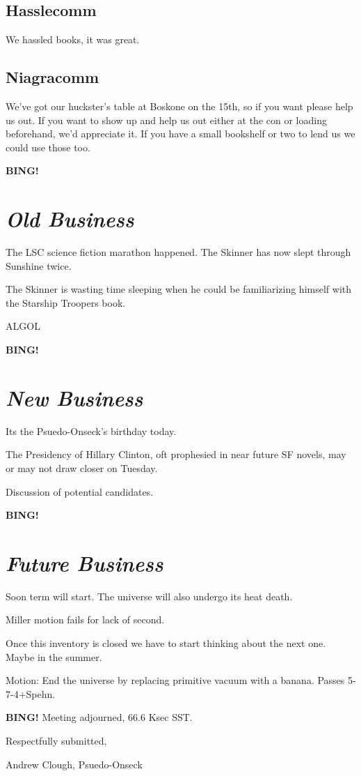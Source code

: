 \documentclass[10pt]{article}
\newcommand{\bing}{{\bf BING!} }
\newcommand{\goto}[1]{\bing \vskip 12pt \section*{{\em{#1}}}}
\begin{document}
\subsection*{Hasslecomm}

We hassled books, it was great.

\subsection*{Niagracomm}

We've got our huckster's table at Boskone on the 15th, so if you want please help us out.  If you want to show up and help us out either at the con or loading beforehand, we'd appreciate it.  If you have a small bookshelf or two to lend us we could use those too.

\goto{Old Business}

The LSC science fiction marathon happened.  The Skinner has now slept through Sunshine twice.

The Skinner is wasting time sleeping when he could be familiarizing himself with the Starship Troopers book.

ALGOL

\goto{New Business}

Its the Psuedo-Onseck's birthday today.

The Presidency of Hillary Clinton, oft prophesied in near future SF novels, may or may not draw closer on Tuesday.

Discussion of potential candidates.

\goto{Future Business}

Soon term will start.  The universe will also undergo its heat death.

Miller motion fails for lack of second.

Once this inventory is closed we have to start thinking about the next one.  Maybe in the summer.

Motion:  End the universe by replacing primitive vacuum with a banana.  Passes 5-7-4+Spehn.

\bing
\noindent
Meeting adjourned, 66.6 Ksec SST.

\vspace{18pt}

\centerline{Respectfully submitted,}
\centerline{Andrew Clough, Psuedo-Onseck}
\end{document}
